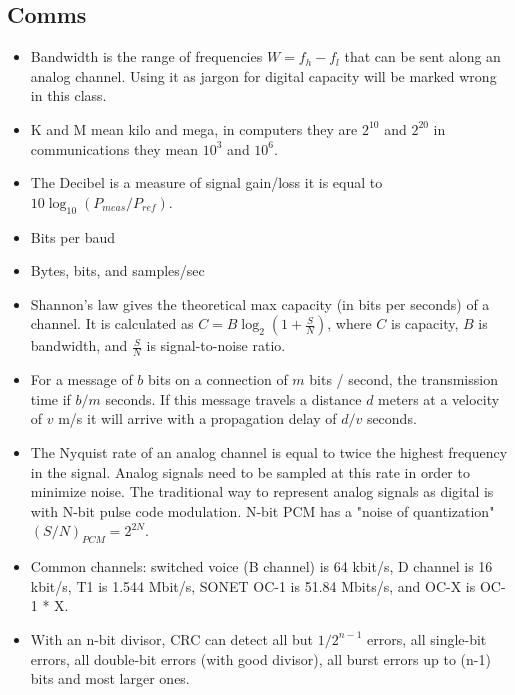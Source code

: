 \documentclass{scrartcl}
\begin{document}
\subsection*{Comms}
\begin{itemize}
\item Bandwidth is the range of frequencies $W = f_h - f_l$ that can be sent
along an analog channel. Using it as jargon for digital capacity will be marked
wrong in this class.
\item K and M mean kilo and mega, in computers they are $2^{10}$ and $2^{20}$ in
communications they mean $10^3$ and $10^6$.
\item The Decibel is a measure of signal gain/loss it is equal to
$10\log_{10}(P_{meas}/P_{ref})$.
\item Bits per baud
\item Bytes, bits, and samples/sec
\item Shannon's law gives the theoretical max capacity (in bits per seconds)
of a channel. It is calculated as $C=B\log_2(1+\frac{S}{N})$, where $C$ is
capacity, $B$ is bandwidth, and $\frac{S}{N}$ is signal-to-noise ratio.
\item For a message of $b$ bits on a connection of $m$ bits / second, the
transmission time if $b/m$ seconds. If this message travels a distance $d$
meters at a velocity of $v$ m/s it will arrive with a propagation delay of $d/v$
seconds.
\item The Nyquist rate of an analog channel is equal to twice the highest
frequency in the signal. Analog signals need to be sampled at this rate in order
to minimize noise. The traditional way to represent analog signals as digital is
with N-bit pulse code modulation. N-bit PCM has a "noise of quantization"
$(S/N)_{PCM} = 2^{2N}$.
\item Common channels: switched voice (B channel) is 64 kbit/s, D channel is
16 kbit/s, T1 is 1.544 Mbit/s, SONET OC-1 is 51.84 Mbits/s, and OC-X is OC-1
* X.
\item With an n-bit divisor, CRC can detect all but $1/2^{n-1}$ errors, all
single-bit errors, all double-bit errors (with good divisor), all burst errors
up to (n-1) bits and most larger ones.
\end{itemize}
\end{document}
